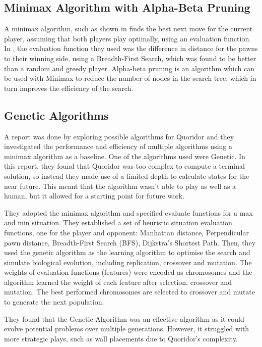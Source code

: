 \documentclass[review]{cmpreport}
\begin{document}
\subsection{Minimax Algorithm with Alpha-Beta Pruning}
A minimax algorithm, such as shown in \cite{plaat1996best} finds the best next move for the current player, assuming that both players play optimally, using an evaluation function. In \cite{josequoridor}, the evaluation function they used was the difference in distance for the pawns to their winning side, using a Breadth-First Search, which was found to be better than a random and greedy player.
Alpha-beta pruning is an algorithm which can be used with Minimax to reduce the number of nodes in the search tree, which in turn improves the efficiency of the search.

\subsection{Genetic Algorithms}
A report was done by \cite{josequoridor} exploring possible algorithms for Quoridor and they investigated the performance and efficiency of multiple algorithms using a minimax algorithm as a baseline. One of the algorithms used were Genetic. In this report, they found that Quoridor was too complex to compute a terminal solution, so instead they made use of a limited depth to calculate states for the near future. This meant that the algorithm wasn't able to play as well as a human, but it allowed for a starting point for future work. 

They adopted the minimax algorithm and specified evaluate functions for a max and min situation. They established a set of heuristic situation evaluation functions, one for the player and opponent: Manhattan distance, Perpendicular pawn distance, Breadth-First Search (BFS), Dijkstra's Shortest Path. Then, they used the genetic algorithm as the learning algorithm to optimise the search and simulate biological evolution, including replication, crossover and mutation. The weights of evaluation functions (features) were encoded as chromosomes and the algorithm learned the weight of each feature after selection, crossover and mutation. The best performed chromosomes are selected to crossover and mutate to generate the next population.

\noindent They found that the Genetic Algorithm was an effective algorithm as it could evolve potential problems over multiple generations. However, it struggled with more strategic plays, such as wall placements due to Quoridor's complexity.
\end{document}
